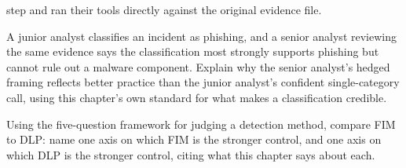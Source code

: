 \begin{reviewquestions}
step and ran their tools directly against the original evidence file.
\item A junior analyst classifies an incident as phishing, and a senior analyst reviewing the same
evidence says the classification most strongly supports phishing but cannot rule out a malware
component. Explain why the senior analyst's hedged framing reflects better practice than the
junior analyst's confident single-category call, using this chapter's own standard for what makes
a classification credible.
\item Using the five-question framework for judging a detection method, compare FIM to DLP: name
one axis on which FIM is the stronger control, and one axis on which DLP is the stronger control,
citing what this chapter says about each.
\end{reviewquestions}

